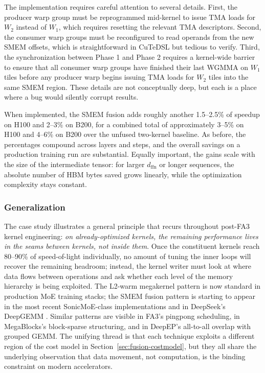 \documentclass[10pt]{article}
\begin{document}
The implementation requires careful attention to several details. First, the producer warp group must be reprogrammed mid-kernel to issue TMA loads for $W_2$ instead of $W_1$, which requires resetting the relevant TMA descriptors. Second, the consumer warp groups must be reconfigured to read operands from the new SMEM offsets, which is straightforward in CuTeDSL but tedious to verify. Third, the synchronization between Phase 1 and Phase 2 requires a kernel-wide barrier to ensure that all consumer warp groups have finished their last WGMMA on $W_1$ tiles before any producer warp begins issuing TMA loads for $W_2$ tiles into the same SMEM region. These details are not conceptually deep, but each is a place where a bug would silently corrupt results.

When implemented, the SMEM fusion adds roughly another 1.5--2.5\% of speedup on H100 and 2--3\% on B200, for a combined total of approximately 3--5\% on H100 and 4--6\% on B200 over the unfused two-kernel baseline. As before, the percentages compound across layers and steps, and the overall savings on a production training run are substantial. Equally important, the gains scale with the size of the intermediate tensor: for larger $d_{\text{ffn}}$ or longer sequences, the absolute number of HBM bytes saved grows linearly, while the optimization complexity stays constant.

\subsubsection{Generalization}
The case study illustrates a general principle that recurs throughout post-FA3 kernel engineering: \emph{on already-optimized kernels, the remaining performance lives in the seams between kernels, not inside them}. Once the constituent kernels reach 80--90\% of speed-of-light individually, no amount of tuning the inner loops will recover the remaining headroom; instead, the kernel writer must look at where data flows between operations and ask whether each level of the memory hierarchy is being exploited. The L2-warm megakernel pattern is now standard in production MoE training stacks; the SMEM fusion pattern is starting to appear in the most recent SonicMoE-class implementations and in DeepSeek's DeepGEMM \citep{deepgemm2024}. Similar patterns are visible in FA3's pingpong scheduling, in MegaBlocks's block-sparse structuring, and in DeepEP's all-to-all overlap with grouped GEMM. The unifying thread is that each technique exploits a different region of the cost model in Section~\ref{sec:fusion-costmodel}, but they all share the underlying observation that data movement, not computation, is the binding constraint on modern accelerators.
\end{document}
